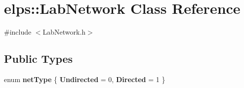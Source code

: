 \hypertarget{classelps_1_1_lab_network}{\section{elps\-:\-:Lab\-Network Class Reference}
\label{classelps_1_1_lab_network}
}


{\ttfamily \#include $<$Lab\-Network.\-h$>$}

\subsection*{Public Types}
\begin{DoxyCompactItemize}
\item 
enum {\bfseries net\-Type} \{ {\bfseries Undirected} = 0, 
{\bfseries Directed} = 1
 \}
\end{DoxyCompactItemize}
